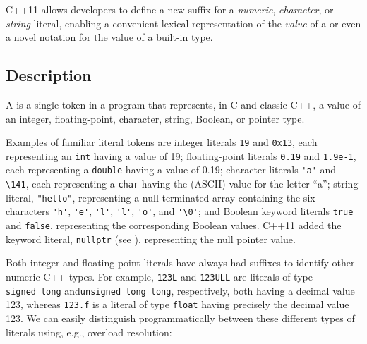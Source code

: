 

\setcounter{table}{0}
\setcounter{footnote}{0}
\setcounter{lstlisting}{0}


C++11 allows developers to define a new suffix for a \emph{numeric},
\emph{character}, or \emph{string} literal, enabling a convenient
lexical representation of the \emph{value} of a  or even a novel notation for the value of a built-in type.

\subsection[Description]{Description}\label{description-userdeflit}

A  is a single token in a program that represents, in C and classic C++, a
value of an integer, floating-point, character, string, Boolean, or
pointer type.

Examples of familiar literal tokens are integer literals \lstinline!19! and
\lstinline!0x13!, each representing an \lstinline!int! having a value of 19;
floating-point literals \lstinline!0.19! and \lstinline!1.9e-1!, each
representing a \lstinline!double! having a value of 0.19; character
literals \lstinline!'a'! and \lstinline!\141!,
each representing a
\lstinline!char! having the (ASCII) value for the letter ``a''; string
literal, \lstinline!"hello"!, representing a null-terminated array
containing the six characters \lstinline!'h'!, \lstinline!'e'!, \lstinline!'l'!,
\lstinline!'l'!, \lstinline!'o'!, and \lstinline!'\0'!;
and Boolean
keyword literals \lstinline!true! and \lstinline!false!, representing the
corresponding Boolean values. C++11 added the keyword literal,
\lstinline!nullptr! (see ), representing the
null pointer value.

Both integer and floating-point literals have always had suffixes to
identify other numeric C++ types. For example, \lstinline!123L! and
\lstinline!123ULL! are literals of type \lstinline!signed!~\lstinline!long! and\linebreak[4]%
\lstinline!unsigned!~\lstinline!long!~\lstinline!long!, respectively, both having
a decimal value 123, whereas \lstinline!123.f! is a literal of type
\lstinline!float! having precisely the decimal value 123. We can easily
distinguish programmatically between these different types of literals
using, e.g., overload resolution:

